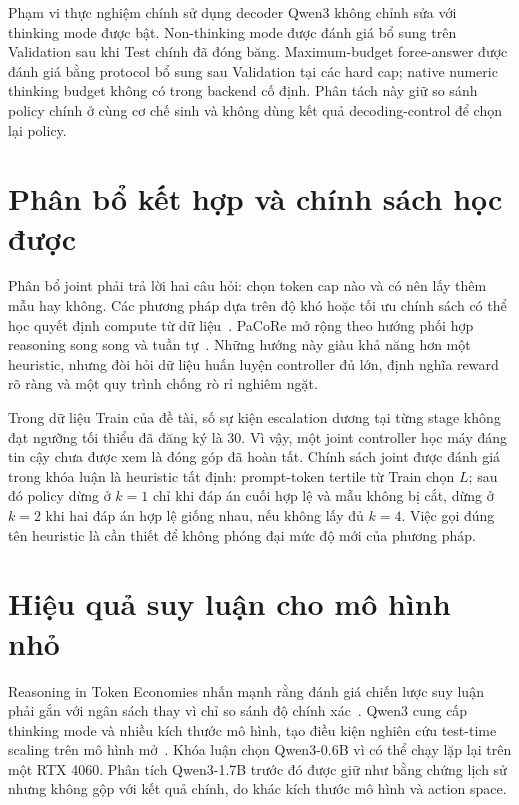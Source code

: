 Phạm vi thực nghiệm chính sử dụng decoder Qwen3 không chỉnh sửa với thinking mode
được bật. Non-thinking mode được đánh giá bổ sung trên Validation sau khi Test chính
đã đóng băng. Maximum-budget force-answer được đánh giá bằng protocol bổ sung
sau Validation tại các hard cap; native numeric thinking budget không có trong
backend cố định. Phân tách này giữ so sánh policy chính ở cùng cơ chế sinh và
không dùng kết quả decoding-control để chọn lại policy.

\section{Phân bổ kết hợp và chính sách học được}

Phân bổ joint phải trả lời hai câu hỏi: chọn token cap nào và có nên lấy thêm mẫu hay
không. Các phương pháp dựa trên độ khó hoặc tối ưu chính sách có thể học quyết định
compute từ dữ liệu~\cite{wang2025penny,zhai2026adaptive}. PaCoRe mở rộng theo hướng
phối hợp reasoning song song và tuần tự~\cite{hu2026pacore}. Những hướng này giàu khả
năng hơn một heuristic, nhưng đòi hỏi dữ liệu huấn luyện controller đủ lớn, định nghĩa
reward rõ ràng và một quy trình chống rò rỉ nghiêm ngặt.

Trong dữ liệu Train của đề tài, số sự kiện escalation dương tại từng stage không đạt
ngưỡng tối thiểu đã đăng ký là 30. Vì vậy, một joint controller học máy đáng tin cậy
chưa được xem là đóng góp đã hoàn tất. Chính sách joint được đánh giá trong khóa luận
là heuristic tất định: prompt-token tertile từ Train chọn $L$; sau đó policy dừng ở
$k=1$ chỉ khi đáp án cuối hợp lệ và mẫu không bị cắt, dừng ở $k=2$ khi hai đáp án hợp
lệ giống nhau, nếu không lấy đủ $k=4$. Việc gọi đúng tên heuristic là cần thiết để
không phóng đại mức độ mới của phương pháp.

\section{Hiệu quả suy luận cho mô hình nhỏ}

Reasoning in Token Economies nhấn mạnh rằng đánh giá chiến lược suy luận phải gắn với
ngân sách thay vì chỉ so sánh độ chính xác~\cite{wang2024tokeneconomies}. Qwen3 cung
cấp thinking mode và nhiều kích thước mô hình, tạo điều kiện nghiên cứu test-time
scaling trên mô hình mở~\cite{qwen3report}. Khóa luận chọn Qwen3-0.6B vì có thể chạy
lặp lại trên một RTX 4060. Phân tích Qwen3-1.7B trước đó được giữ như bằng chứng lịch
sử nhưng không gộp với kết quả chính, do khác kích thước mô hình và action space.

